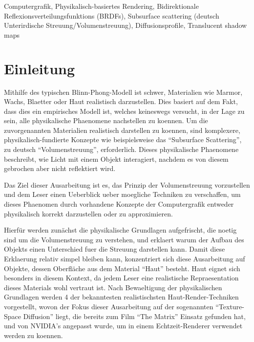 \documentclass[ngerman,runningheads,a4paper]{llncs}[2018/03/10]
\begin{document}
\begin{keywords}
  Computergrafik, Physikalisch-basiertes Rendering, Bidirektionale Reflexionsverteilungsfunktions (BRDFs), Subsurface scattering (deutsch Unterirdische Streuung/Volumenstreuung), Diffusionsprofile, Translucent shadow maps
\end{keywords}

\section{Einleitung}
\label{sec:intro}

Mithilfe des typischen Blinn-Phong-Modell ist schwer, Materialien wie Marmor, Wachs, Blaetter oder Haut realistisch darzustellen. Dies basiert auf dem Fakt, dass dies ein empirisches Modell ist, welches keineswegs versucht, in der Lage zu sein, alle physikalische Phaenomene nachstellen zu koennen.
Um die zuvorgenannten Materialien realistisch darstellen zu koennen, sind komplexere, physikalisch-fundierte Konzepte wie beispielsweise das \enquote{Subsurface Scattering}, zu deutsch \enquote{Volumenstreuung}, erforderlich.
Dieses physikalische Phaenomene beschreibt, wie Licht mit einem Objekt interagiert, nachdem es von diesem gebrochen aber nicht reflektiert wird.

Das Ziel dieser Ausarbeitung ist es, das Prinzip der Volumenstreuung vorzustellen und dem Leser einen Ueberblick ueber moegliche Techniken zu verschaffen, um dieses Phaenomen durch vorhandene Konzepte der Computergrafik entweder physikalisch korrekt darzustellen oder zu approximieren.

Hierfür werden zunächst die physikalische Grundlagen aufgefrischt, die noetig sind um die Volumenstreuung zu verstehen, und erklaert warum der Aufbau des Objekts einen Unterschied fuer die Streuung darstellen kann.
Damit diese Erklaerung relativ simpel bleiben kann, konzentriert sich diese Ausarbeitung auf Objekte, dessen Oberfläche aus dem Material \enquote{Haut} besteht.
Haut eignet sich besonders in diesem Kontext, da jedem Leser eine realistische Repraesentation dieses Materials wohl vertraut ist.
Nach Bewaeltigung der physikalischen Grundlagen werden 4 der bekanntesten realistischsten Haut-Render-Techniken vorgestellt, wovon der Fokus dieser Ausarbeitung auf der sogenannten \enquote{Texture-Space Diffusion} liegt, die bereits zum Film \enquote{The Matrix} Einsatz gefunden hat, und von NVIDIA's \citeauthor{advanced-realtime-skin-rendering} angepasst wurde, um in einem Echtzeit-Renderer verwendet werden zu koennen.
\end{document}
